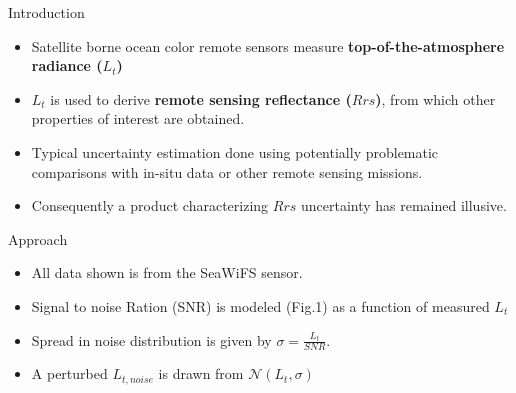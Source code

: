 \documentclass[final]{beamer}
\newlength{\onecolwid}
\begin{document}
\begin{frame}[t]
\begin{columns}[t]
\begin{column}{\onecolwid}
\begin{block}{Introduction}
\begin{itemize}
\item Satellite borne ocean color remote sensors measure \textbf{top-of-the-atmosphere radiance ($L_t$)}
\item $L_t$ is used to derive \textbf{remote sensing reflectance ($Rrs$)}, from which other  properties of interest are obtained.
\item Typical uncertainty estimation done using potentially problematic comparisons with in-situ data or other remote sensing missions\cite{BW:2006,Tle:2000,Hu:2013}.
\item Consequently a product characterizing $Rrs$ uncertainty has remained illusive.
\end{itemize}
\end{block}


\begin{block}{Approach}
\begin{itemize}
\item All data shown is from the SeaWiFS sensor.
\item Signal to noise Ration (SNR) is modeled (Fig.1) as a function of measured $L_t$
\item Spread in noise distribution is given by $\sigma = \frac{L_t}{SNR}$.
\item A perturbed $L_{t,noise}$ is drawn from $\mathcal{N}(L_t, \sigma)$
\end{itemize}


\end{block}
\end{column}
\end{columns}
\end{frame}
\end{document}
